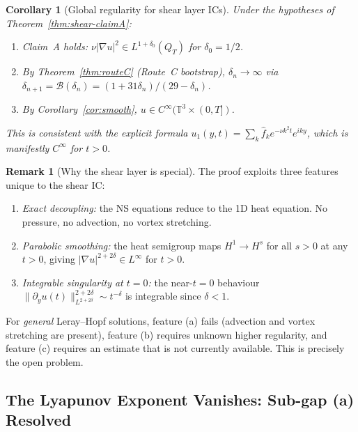 \documentclass[11pt]{article}
\newtheorem{corollary}[theorem]{Corollary}
\theoremstyle{definition}
\newtheorem{remark}[theorem]{Remark}
\theoremstyle{remark}
\newcommand{\T}{\mathbb{T}}
\begin{document}
\begin{corollary}[Global regularity for shear layer ICs]
\label{cor:shear-smooth}
  Under the hypotheses of Theorem~\ref{thm:shear-claimA}:
  \begin{enumerate}[label=(\roman*)]
  \item Claim~A holds: $\nu|\nabla u|^2\in L^{1+\delta_0}(Q_T)$ for
        $\delta_0 = 1/2$.
  \item By Theorem~\ref{thm:routeC} (Route~C bootstrap), $\delta_n\to\infty$
        via $\delta_{n+1}=\mathcal{B}(\delta_n)=(1+31\delta_n)/(29-\delta_n)$.
  \item By Corollary~\ref{cor:smooth}, $u\in C^\infty(\T^3\times(0,T])$.
  \end{enumerate}
  This is consistent with the explicit formula
  $u_1(y,t)=\sum_k\hat f_ke^{-\nu k^2 t}e^{iky}$,
  which is manifestly $C^\infty$ for $t>0$.
\end{corollary}

\begin{remark}[Why the shear layer is special]
\label{rem:shear-special}
  The proof exploits three features unique to the shear IC:
  \begin{enumerate}[label=(\alph*)]
  \item \emph{Exact decoupling:} the NS equations reduce to the 1D heat equation.
        No pressure, no advection, no vortex stretching.
  \item \emph{Parabolic smoothing:} the heat semigroup maps $H^1\to H^s$ for
        all $s>0$ at any $t>0$, giving $|\nabla u|^{2+2\delta}\in L^\infty$
        for $t>0$.
  \item \emph{Integrable singularity at $t=0$:} the near-$t=0$ behaviour
        $\|\partial_y u(t)\|_{L^{2+2\delta}}^{2+2\delta}\sim t^{-\delta}$
        is integrable since $\delta<1$.
  \end{enumerate}
  For \emph{general} Leray--Hopf solutions, feature (a) fails (advection
  and vortex stretching are present), feature (b) requires unknown higher
  regularity, and feature (c) requires an estimate that is not currently
  available.  This is precisely the open problem.
\end{remark}

\subsection{The Lyapunov Exponent Vanishes: Sub-gap (a) Resolved}
\label{sec:lyapunov-zero}
\end{document}
